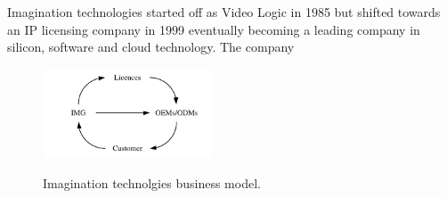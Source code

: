 
Imagination technologies started off as Video Logic in 1985 but shifted towards an IP licensing company in 1999 eventually becoming a leading company in silicon, software and cloud technology.
The company


\begin{figure}[htb]
   \centering
   \includegraphics[width = 0.45\textwidth]{figures/ImgModel.pdf}
   \label{figure:fig3orig}
   \caption{Imagination technolgies business model.}
\end{figure}
